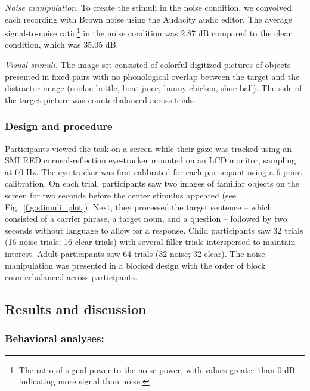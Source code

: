 \documentclass[english,floatsintext,man]{apa6}
\theoremstyle{definition}
\theoremstyle{definition}
\theoremstyle{definition}
\theoremstyle{remark}
\begin{document}
\emph{Noise manipulation}. To create the stimuli in the noise condition,
we convolved each recording with Brown noise using the Audacity audio
editor. The average signal-to-noise ratio\footnote{The ratio of signal
  power to the noise power, with values greater than 0 dB indicating
  more signal than noise.} in the noise condition was 2.87 dB compared
to the clear condition, which was 35.05 dB.

\emph{Visual stimuli.} The image set consisted of colorful digitized
pictures of objects presented in fixed pairs with no phonological
overlap between the target and the distractor image (cookie-bottle,
boat-juice, bunny-chicken, shoe-ball). The side of the target picture
was counterbalanced across trials.

\hypertarget{design-and-procedure-2}{%
\subsubsection{Design and procedure}\label{design-and-procedure-2}}

Participants viewed the task on a screen while their gaze was tracked
using an SMI RED corneal-reflection eye-tracker mounted on an LCD
monitor, sampling at 60 Hz. The eye-tracker was first calibrated for
each participant using a 6-point calibration. On each trial,
participants saw two images of familiar objects on the screen for two
seconds before the center stimulus appeared (see
Fig.~\ref{fig:stimuli_plot}). Next, they processed the target sentence
-- which consisted of a carrier phrase, a target noun, and a question --
followed by two seconds without language to allow for a response. Child
participants saw 32 trials (16 noise trials; 16 clear trials) with
several filler trials interspersed to maintain interest. Adult
participants saw 64 trials (32 noise; 32 clear). The noise manipulation
was presented in a blocked design with the order of block
counterbalanced across participants.

\hypertarget{results-and-discussion-2}{%
\subsection{Results and discussion}\label{results-and-discussion-2}}

\hypertarget{behavioral-analyses-2}{%
\subsubsection{Behavioral analyses:}\label{behavioral-analyses-2}}
\end{document}

